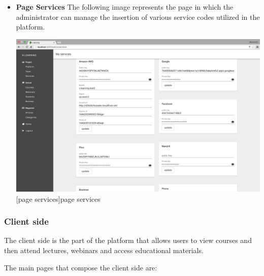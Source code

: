 \begin{itemize}
\item \textbf{Page Services} The following image represents the page in which the administrator can manage the insertion of various service codes utilized in the platform.\par

\begin{minipage}{\linewidth}
    \centering
    \includegraphics[width=1.0\linewidth]{images/chapter4/page-services-admin.png}
    [page services]{page services}
\end{minipage}

\end{itemize}


\subsubsection {Client side}
\label{subsec:Client_side}
The client side is the part of the platform that allows users to view courses and then attend lectures, webinars and access educational materials.

The main pages that compose the client side are:

